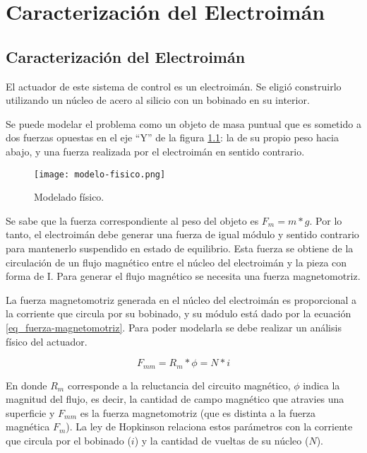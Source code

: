 \chapter{Caracterización del  Electroimán}  \label{cap:CaracterizaciónElectroimán}

\section{Caracterización del Electroimán}

\noindent El actuador de este sistema de control es un electroimán. Se eligió construirlo utilizando un núcleo de acero al silicio con un bobinado en su interior. 

\noindent Se puede modelar el problema como un objeto de masa puntual que es sometido a dos fuerzas opuestas en el eje “Y” de la figura \ref{fig:img_modelado-fisico}: la de su propio peso hacia abajo, y una fuerza realizada por el electroimán en sentido contrario.

\begin{figure}[H]
	\centering
	\texttt{[image: modelo-fisico.png]}
	\caption{Modelado físico.}
	\label{fig:img_modelado-fisico}
\end{figure}

\noindent Se sabe que la fuerza correspondiente al peso del objeto es $F_{m}=m*g$. Por lo tanto, el electroimán debe generar una fuerza de igual módulo y sentido contrario para mantenerlo suspendido en estado de equilibrio. Esta fuerza se obtiene de la circulación de un flujo magnético entre el núcleo del electroimán y la pieza con forma de I. Para generar el flujo magnético se necesita una fuerza magnetomotriz.

\noindent La fuerza magnetomotriz generada en el núcleo del electroimán es proporcional a la corriente que circula por su bobinado, y su módulo está dado por la ecuación \ref{eq_fuerza-magnetomotriz}. Para poder modelarla se debe realizar un análisis físico del actuador. 

\begin{equation} \label{eq_fuerza-magnetomotriz}
	F_{mm}=R_{m}*\phi=N*i	
\end{equation}

\noindent En donde $R_{m}$ corresponde a la reluctancia del circuito magnético, $\phi$ indica la magnitud del flujo, es decir, la cantidad de campo magnético que atravies una superficie y $F_{mm}$ es la fuerza magnetomotriz (que es distinta a la fuerza magnética $F_{m}$). La ley de Hopkinson relaciona estos parámetros con la corriente que circula por el bobinado ($i$) y la cantidad de vueltas de su núcleo ($N$).


